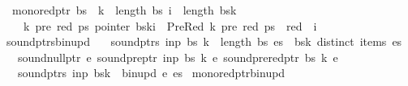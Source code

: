 \begin{isabellebody}
\ \ {\isachardoublequoteopen}mono{\isacharunderscore}{\kern0pt}red{\isacharunderscore}{\kern0pt}ptr\ bs\ {\isasymequiv}\ {\isasymforall}k\ {\isacharless}{\kern0pt}\ length\ bs{\isachardot}{\kern0pt}\ {\isasymforall}i\ {\isacharless}{\kern0pt}\ length\ {\isacharparenleft}{\kern0pt}bs{\isacharbang}{\kern0pt}k{\isacharparenright}{\kern0pt}{\isachardot}{\kern0pt}\isanewline
\ \ \ \ {\isasymforall}k{\isacharprime}{\kern0pt}\ pre\ red\ ps{\isachardot}{\kern0pt}\ pointer\ {\isacharparenleft}{\kern0pt}bs{\isacharbang}{\kern0pt}k{\isacharbang}{\kern0pt}i{\isacharparenright}{\kern0pt}\ {\isacharequal}{\kern0pt}\ PreRed\ {\isacharparenleft}{\kern0pt}k{\isacharprime}{\kern0pt}{\isacharcomma}{\kern0pt}\ pre{\isacharcomma}{\kern0pt}\ red{\isacharparenright}{\kern0pt}\ ps\ {\isasymlongrightarrow}\ red\ {\isacharless}{\kern0pt}\ i{\isachardoublequoteclose}\isanewline
\isanewline
{}\isamarkupfalse%
\ sound{\isacharunderscore}{\kern0pt}ptrs{\isacharunderscore}{\kern0pt}bin{\isacharunderscore}{\kern0pt}upd{\isacharcolon}{\kern0pt}\isanewline
\ \ \ {\isachardoublequoteopen}sound{\isacharunderscore}{\kern0pt}ptrs\ inp\ bs{\isachardoublequoteclose}\ {\isachardoublequoteopen}k\ {\isacharless}{\kern0pt}\ length\ bs{\isachardoublequoteclose}\ {\isachardoublequoteopen}es\ {\isacharequal}{\kern0pt}\ bs{\isacharbang}{\kern0pt}k{\isachardoublequoteclose}\ {\isachardoublequoteopen}distinct\ {\isacharparenleft}{\kern0pt}items\ es{\isacharparenright}{\kern0pt}{\isachardoublequoteclose}\isanewline
\ \ \ {\isachardoublequoteopen}sound{\isacharunderscore}{\kern0pt}null{\isacharunderscore}{\kern0pt}ptr\ e{\isachardoublequoteclose}\ {\isachardoublequoteopen}sound{\isacharunderscore}{\kern0pt}pre{\isacharunderscore}{\kern0pt}ptr\ inp\ bs\ k\ e{\isachardoublequoteclose}\ {\isachardoublequoteopen}sound{\isacharunderscore}{\kern0pt}prered{\isacharunderscore}{\kern0pt}ptr\ bs\ k\ e{\isachardoublequoteclose}\isanewline
\ \ \ {\isachardoublequoteopen}sound{\isacharunderscore}{\kern0pt}ptrs\ inp\ {\isacharparenleft}{\kern0pt}bs{\isacharbrackleft}{\kern0pt}k\ {\isacharcolon}{\kern0pt}{\isacharequal}{\kern0pt}\ bin{\isacharunderscore}{\kern0pt}upd\ e\ es{\isacharbrackright}{\kern0pt}{\isacharparenright}{\kern0pt}{\isachardoublequoteclose}%
\isadelimproof
%
\endisadelimproof
%
\isatagproof
%
\endisatagproof
{\isafoldproof}%
%
\isadelimproof
\isanewline
%
\endisadelimproof
{}\isamarkupfalse%
\ mono{\isacharunderscore}{\kern0pt}red{\isacharunderscore}{\kern0pt}ptr{\isacharunderscore}{\kern0pt}bin{\isacharunderscore}{\kern0pt}upd{\isacharcolon}{\kern0pt}\isanewline

\end{isabellebody}
